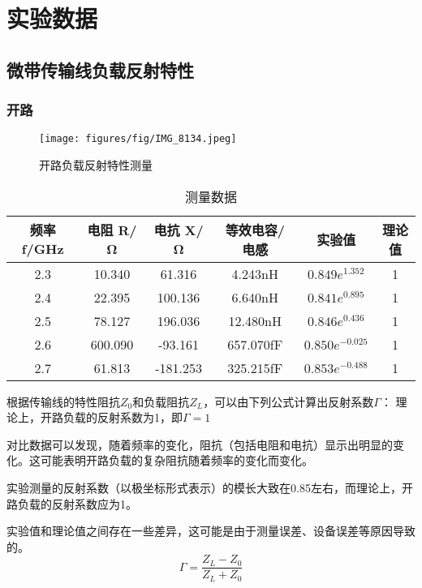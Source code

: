 \documentclass[12pt,hyperref,a4paper,UTF8]{ctexart}
\begin{document}
\section{实验数据}
\subsection{微带传输线负载反射特性}
\subsubsection{开路}

\begin{figure}[H]
    \centering
    \texttt{[image: figures/fig/IMG\_8134.jpeg]}
    \caption{开路负载反射特性测量}
    \label{fig:enter-label}
\end{figure}

\begin{table}[h]
\centering
\begin{tabular}{cccccc}
\hline
频率 f/GHz & 电阻 R/Ω & 电抗 X/Ω & 等效电容/电感 & 实验值 & 理论值 \\
\hline
2.3 & 10.340 & 61.316 & 4.243nH & $0.849e^{1.352}$ & 1 \\
2.4 & 22.395 & 100.136 & 6.640nH & $0.841e^{0.895}$ & 1 \\
2.5 & 78.127 & 196.036 & 12.480nH & $0.846e^{0.436}$ & 1 \\
2.6 & 600.090 & -93.161 & 657.070fF & $0.850e^{-0.025}$ & 1 \\
2.7 & 61.813 & -181.253 & 325.215fF & $0.853e^{-0.488}$ & 1 \\

\hline
\end{tabular}
\caption{测量数据}
\label{tab:my_label}
\end{table}



根据传输线的特性阻抗$Z_0$和负载阻抗$Z_L$，可以由下列公式计算出反射系数$\Gamma$：
理论上，开路负载的反射系数为1，即$\Gamma = 1$

对比数据可以发现，随着频率的变化，阻抗（包括电阻和电抗）显示出明显的变化。这可能表明开路负载的复杂阻抗随着频率的变化而变化。

实验测量的反射系数（以极坐标形式表示）的模长大致在0.85左右，而理论上，开路负载的反射系数应为1。

实验值和理论值之间存在一些差异，这可能是由于测量误差、设备误差等原因导致的。
\begin{equation}
    \Gamma = \frac{Z_L - Z_0}{Z_L + Z_0}
\end{equation}
\end{document}
